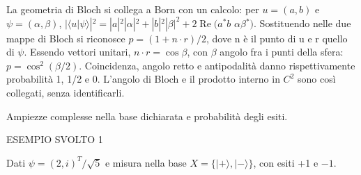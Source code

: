 La geometria di Bloch si collega a Born con un calcolo: per \(u=(a,\allowbreak b)\) e \(\psi =(\alpha ,\allowbreak \beta )\), \(|\langle u|\psi \rangle |^{2}=|a|^{2}|\alpha |^{2}+|b|^{2}|\beta |^{2}+2\operatorname{Re}(a{}^{*}b\) \(\alpha \beta {}^{*})\). Sostituendo nelle due mappe di Bloch si riconosce \(p=(1+n\cdot r)/2\), dove n è il punto di u e r quello di \(\psi \). Essendo vettori unitari, \(n\cdot r=\cos \beta \), con \(\beta \) angolo fra i punti della sfera: \(p=\cos ^{2}(\beta /2)\). Coincidenza, angolo retto e antipodalità danno rispettivamente probabilità 1, 1/2 e 0. L'angolo di Bloch e il prodotto interno in \(C^{2}\) sono così collegati, senza identificarli.\par



Ampiezze complesse nella base dichiarata e probabilità degli esiti.\par


\Needspace{.36\textheight}\label{c2-born-example-1}
{\sffamily\small\color{Accent} ESEMPIO SVOLTO 1\par}
Dati \(\psi =(2,\allowbreak i)^{T}/\sqrt{5}\) e misura nella base \(X=\{|+\rangle ,\allowbreak |- \rangle \}\), con esiti +1 e \(- 1\).\par


